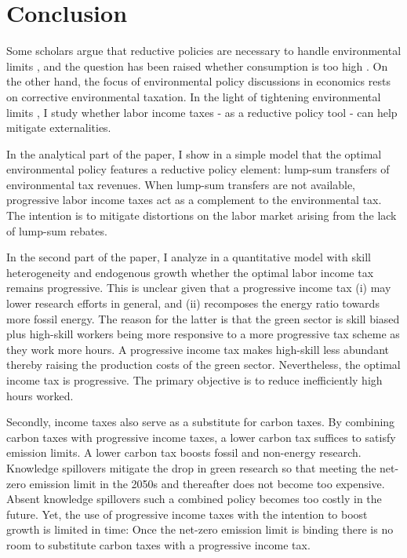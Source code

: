 \section{Conclusion}\label{sec:con}
Some scholars argue that  reductive policies are necessary to handle environmental limits \citep{Schor2005SustainableReductionb, VanVuuren2018AlternativeTechnologies, Bertram2018TargetedScenarios}, and the question has been raised whether consumption is too high \citep{Arrow2004AreMuch}. On the other hand, the focus of environmental policy discussions in economics rests on corrective environmental taxation. In the light of tightening environmental limits \citep{Rockstrom2009AHumanity, IPCC2022}, I study whether labor income taxes - as a reductive policy tool - can help mitigate externalities. 

In the analytical part of the paper, I show in a simple model that the optimal environmental policy features a reductive policy element: lump-sum transfers of environmental tax revenues. When lump-sum transfers are not available, progressive labor income taxes act as a complement to the environmental tax. The intention is to mitigate distortions on the labor market arising from the lack of lump-sum rebates. %


In the second part of the paper, I analyze in a quantitative model with skill heterogeneity and endogenous growth whether the optimal labor income tax remains progressive.
This is unclear given that a progressive income tax (i) may lower research efforts in general, and (ii) recomposes the energy ratio towards more fossil energy. The reason for the latter is that the green sector is skill biased plus high-skill workers being more responsive to a more progressive tax scheme as they work more hours. 
A progressive income tax makes high-skill less abundant thereby raising the production costs of the green sector. 
Nevertheless, the optimal income tax is progressive. The primary objective is to reduce inefficiently high hours worked. 

Secondly, income taxes also serve as a substitute for carbon taxes.
By combining carbon taxes with progressive income taxes, a lower carbon tax suffices to satisfy emission limits. A lower carbon tax boosts fossil and non-energy research. Knowledge spillovers mitigate the drop in green research so that meeting the net-zero emission limit in the 2050s and thereafter does not become too expensive. Absent knowledge spillovers such a combined policy becomes too costly in the future. Yet, the use of progressive income taxes with the intention to boost growth is limited in time: Once the net-zero emission limit is binding there is no room to substitute carbon taxes with a progressive income tax. 

